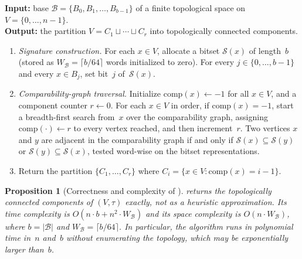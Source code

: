 \documentclass[11pt,a4paper]{article}
\theoremstyle{plain}
\newtheorem{proposition}[theorem]{Proposition}
\theoremstyle{definition}
\newcommand{\base}{\mathcal{B}}
\begin{document}
\begin{algorithm}
\caption{Connected components via the specialization preorder}%
\label{alg:specialization-components}
\textbf{Input:} base $\base = \{B_0, B_1, \ldots, B_{b-1}\}$ of a finite
topological space on~$V = \{0, \ldots, n-1\}$. \\
\textbf{Output:} the partition $V = C_1 \sqcup \cdots \sqcup C_r$ into
topologically connected components.
\begin{enumerate}[leftmargin=2em, label=\textup{(\arabic*)}]
  \item \emph{Signature construction.}  For each $x \in V$, allocate a bitset
        $\mathcal{S}(x)$ of length~$b$ (stored as $W_{\base} = \lceil b/64
        \rceil$ words initialized to zero).  For every $j \in \{0, \ldots,
        b-1\}$ and every $x \in B_j$, set bit~$j$ of~$\mathcal{S}(x)$.
  \item \emph{Comparability-graph traversal.}  Initialize $\mathrm{comp}(x)
        \leftarrow -1$ for all $x \in V$, and a component counter
        $r \leftarrow 0$.  For each $x \in V$ in order, if $\mathrm{comp}(x)
        = -1$, start a breadth-first search from~$x$ over the comparability
        graph, assigning $\mathrm{comp}(\cdot) \leftarrow r$ to every vertex
        reached, and then increment~$r$.  Two vertices $x$ and $y$ are
        adjacent in the comparability graph if and only if
        $\mathcal{S}(x) \subseteq \mathcal{S}(y)$ or
        $\mathcal{S}(y) \subseteq \mathcal{S}(x)$, tested word-wise on the
        bitset representations.
  \item Return the partition $\{C_1, \ldots, C_r\}$ where
        $C_i = \{x \in V : \mathrm{comp}(x) = i - 1\}$.
\end{enumerate}
\end{algorithm}

\begin{proposition}[Correctness and complexity of
]%
\label{prop:specialization-complexity}
 returns the topologically connected
components of $(V, \tau)$ exactly, not as a heuristic approximation.  Its
time complexity is $O(n \cdot b + n^{2} \cdot W_{\base})$ and its space
complexity is $O(n \cdot W_{\base})$, where $b = |\base|$ and
$W_{\base} = \lceil b / 64 \rceil$.  In particular, the algorithm runs in
polynomial time in~$n$ and~$b$ without enumerating the topology, which may
be exponentially larger than~$b$.
\end{proposition}
\end{document}
